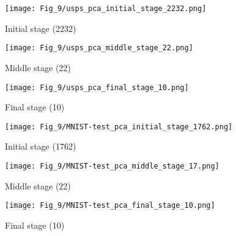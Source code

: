 \documentclass[10pt,twocolumn,letterpaper]{article}
\begin{document}
\begin{figure*}[t]
   \begin{subfigure}{0.33\linewidth}
   \centering
    \texttt{[image: Fig\_9/usps\_pca\_initial\_stage\_2232.png]}
    \vspace{-5pt}
    \caption{Initial stage (2232)}
    \vspace{20pt}
   \end{subfigure}
   \begin{subfigure}{0.33\linewidth}
   \centering
    \texttt{[image: Fig\_9/usps\_pca\_middle\_stage\_22.png]}
    \vspace{-5pt}
    \caption{Middle stage (22)}
    \vspace{20pt}
   \end{subfigure}
   \begin{subfigure}{0.33\linewidth}
   \centering
       \texttt{[image: Fig\_9/usps\_pca\_final\_stage\_10.png]}
   \vspace{-5pt}
   \caption{Final stage (10)}
   \vspace{20pt}
   \end{subfigure}

   \begin{subfigure}{0.33\linewidth}
   \centering
    \texttt{[image: Fig\_9/MNIST-test\_pca\_initial\_stage\_1762.png]}
    \vspace{-5pt}
    \caption{Initial stage (1762)}
    \vspace{20pt}
   \end{subfigure}
   \begin{subfigure}{0.33\linewidth}
   \centering
    \texttt{[image: Fig\_9/MNIST-test\_pca\_middle\_stage\_17.png]}
    \vspace{-5pt}
    \caption{Middle stage (22)}
    \vspace{20pt}
   \end{subfigure}
   \begin{subfigure}{0.33\linewidth}
   \centering
       \texttt{[image: Fig\_9/MNIST-test\_pca\_final\_stage\_10.png]}
   \vspace{-5pt}
   \caption{Final stage (10)}
   \vspace{20pt}
   \end{subfigure}


\end{figure*}
\end{document}
